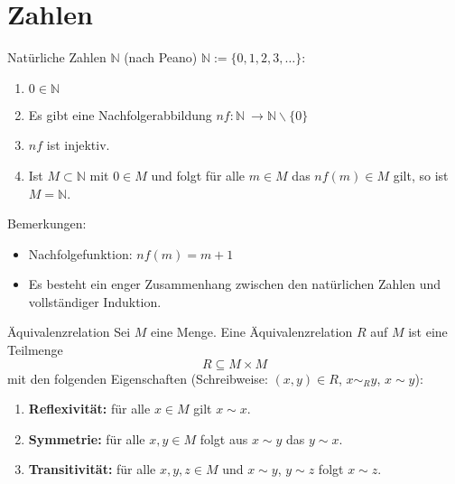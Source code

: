 \documentclass[notes=hide,hyperref={dvipdfmx,pdfpagelabels=false}]{beamer}
\begin{document}
\section{Zahlen}

\begin{frame}{Natürliche Zahlen $\mathbb{N}$ (nach Peano)}
$\mathbb{N} := \{0,1,2,3,\dots\}$:
\begin{enumerate}
\item $0 \in \mathbb{N}$
\item Es gibt eine Nachfolgerabbildung $nf : \mathbb{N} \
  \rightarrow \mathbb{N} \smallsetminus \{ 0 \}$
\item $nf$ ist injektiv.
\item Ist $M \subset \mathbb{N}$ mit $0 \in M$ und folgt für alle  $m \in M$ das
  $nf(m) \in M$ gilt, so ist $M=\mathbb{N}$.
\end{enumerate}
Bemerkungen:
\begin{itemize}
\item Nachfolgefunktion: $nf(m)=m+1$
\item Es besteht ein enger Zusammenhang zwischen den natürlichen
  Zahlen und vollständiger  Induktion.
\end{itemize}
\end{frame}

\begin{frame}{Äquivalenzrelation}
Sei $M$ eine Menge. Eine {\color{red} Äquivalenzrelation} $R$ auf $M$ ist eine Teilmenge
\[R\subseteq M \times M\]
 mit den folgenden Eigenschaften (Schreibweise: $(x,y) \in R$, $x \sim_R y$, $x \sim y$):
\begin{enumerate}
\item \textbf{Reflexivität:} für alle $x \in M$ gilt $x \sim x$. 
\item \textbf{Symmetrie:} für alle $x,y \in M$ folgt aus $x \sim y$ das $y \sim x$.
\item \textbf{Transitivität:} für alle $x,y,z \in M$ und $x \sim y$, $y \sim z$ folgt
  $x \sim z$.  
\end{enumerate}
\end{frame}
\end{document}
